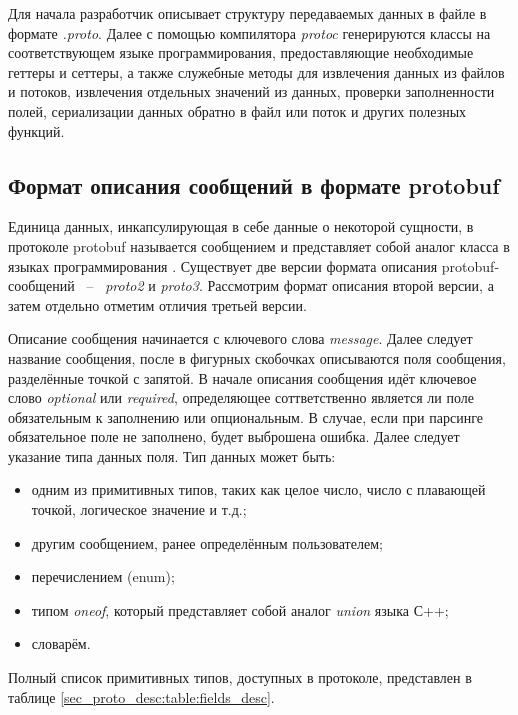 Для начала разработчик описывает структуру передаваемых данных в файле в формате \textit{.proto}. 
Далее с помощью компилятора \textit{protoc} генерируются классы на соответствующем языке программирования, предоставляющие необходимые геттеры и сеттеры,
а также служебные методы для извлечения данных из файлов и потоков, извлечения отдельных значений из данных, 
проверки заполненности полей, сериализации данных обратно в файл или поток и других полезных функций.

\subsection{Формат описания сообщений в формате protobuf}

Единица данных, инкапсулирующая в себе данные о некоторой сущности, в протоколе protobuf называется 
сообщением и представляет собой аналог класса в языках программирования \cite{protobuf_api}.
Существует две версии формата описания protobuf-сообщений ~--~ \textit{proto2} и \textit{proto3}. Рассмотрим формат описания второй версии, а затем отдельно отметим отличия третьей версии.

Описание сообщения начинается с ключевого слова \textit{message}. Далее следует название сообщения, после в фигурных скобочках описываются поля сообщения, разделённые точкой с запятой.
В начале описания сообщения идёт ключевое слово \textit{optional} или \textit{required}, определяющее соттветственно является ли поле обязательным к заполнению или опциональным. В случае, если при парсинге обязательное поле не заполнено, будет выброшена ошибка. Далее следует указание типа данных поля. Тип данных может быть:
\begin{itemize}
    \item одним из примитивных типов, таких как целое число, число с плавающей точкой, логическое значение и т.д.;
    \item другим сообщением, ранее определённым пользователем;
    \item перечислением (enum);
    \item типом \textit{oneof}, который представляет собой аналог \textit{union} языка С++;
    \item словарём.
\end{itemize}

Полный список примитивных типов, доступных в протоколе, представлен в таблице \ref{sec_proto_desc:table:fields_desc}\cite{protobuf_scalar}.

